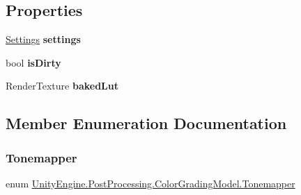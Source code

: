 \subsection*{Properties}
\begin{DoxyCompactItemize}
\item 
\mbox{\label{class_unity_engine_1_1_post_processing_1_1_color_grading_model_a340b78e970e8cc5c66abbd4957d88b9c}} 
\hyperlink{struct_unity_engine_1_1_post_processing_1_1_color_grading_model_1_1_settings}{Settings} {\bfseries settings}
\item 
\mbox{\label{class_unity_engine_1_1_post_processing_1_1_color_grading_model_a05a2c8285ca219e5846080bec932b988}} 
bool {\bfseries is\+Dirty}
\item 
\mbox{\label{class_unity_engine_1_1_post_processing_1_1_color_grading_model_ab93b4bd2bb81196e8751efa337f451f3}} 
Render\+Texture {\bfseries baked\+Lut}
\end{DoxyCompactItemize}


\subsection{Member Enumeration Documentation}
\mbox{\label{class_unity_engine_1_1_post_processing_1_1_color_grading_model_a4955bb9dfed7e27c93e7493ff66f3de6}} 
\subsubsection{\texorpdfstring{Tonemapper}{Tonemapper}}
{\footnotesize\ttfamily enum \hyperlink{class_unity_engine_1_1_post_processing_1_1_color_grading_model_a4955bb9dfed7e27c93e7493ff66f3de6}{Unity\+Engine.\+Post\+Processing.\+Color\+Grading\+Model.\+Tonemapper}\hspace{0.3cm}{\ttfamily [strong]}}

